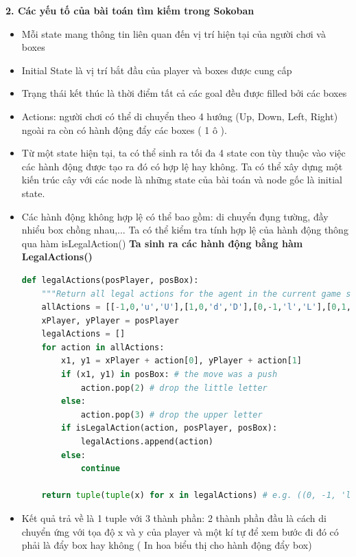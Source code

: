 \documentclass[12pt]{article}
\begin{document}
\hspace{-1em}\textbf{2. Các yếu tố của bài toán tìm kiếm trong Sokoban}
\begin{itemize}
	\lstset{style=mystyle}
	\item Mỗi state mang thông tin liên quan đến vị trí hiện tại của người chơi và boxes
	\item Initial State là vị trí bắt đầu của player và boxes được cung cấp
	\item Trạng thái kết thúc là thời điểm tất cả các goal đều được filled bởi các boxes
	\item Actions: người chơi có thể di chuyển theo 4 hướng (Up, Down, Left, Right) ngoài ra còn có hành động đẩy các boxes ( 1 ô ). 
	\item Từ một state hiện tại, ta có thể sinh ra tối đa 4 state con tùy thuộc vào việc các hành động được tạo ra đó có hợp lệ hay không. Ta có thể xây dựng một kiến trúc cây với các node là những state của bài toán và node gốc là initial state.
	\item Các hành động không hợp lệ có thể bao gồm: di chuyển đụng tường, đầy nhiểu box chồng nhau,... Ta có thể kiểm tra tính hợp lệ của hành động thông qua hàm isLegalAction()
	\newpage
	\noindent \hspace*{-1em}\textbf{
		Ta sinh ra các hành
động bằng hàm LegalActions()}
	\begin{tcolorbox}[boxrule=0.5pt, colback=white]
		\begin{lstlisting}[language=python, numbers=none, basicstyle=\ttfamily\footnotesize]		
def legalActions(posPlayer, posBox):
	"""Return all legal actions for the agent in the current game state"""
	allActions = [[-1,0,'u','U'],[1,0,'d','D'],[0,-1,'l','L'],[0,1,'r','R']]
	xPlayer, yPlayer = posPlayer
	legalActions = []
	for action in allActions:
		x1, y1 = xPlayer + action[0], yPlayer + action[1]
		if (x1, y1) in posBox: # the move was a push
			action.pop(2) # drop the little letter
		else:
			action.pop(3) # drop the upper letter
		if isLegalAction(action, posPlayer, posBox): 
			legalActions.append(action)
		else: 
			continue     

	return tuple(tuple(x) for x in legalActions) # e.g. ((0, -1, 'l'), (0, 1, 'R'))
		\end{lstlisting}
		\end{tcolorbox}
	\item Kết quả trả về là 1 tuple	với 3 thành phần: 2 thành phần đầu là cách di chuyển ứng với tọa độ x và y của player và một
	kí tự để xem bước đi đó có phải là đẩy box hay không ( In hoa biểu thị cho hành động đẩy box)


\end{itemize}
\end{document}
